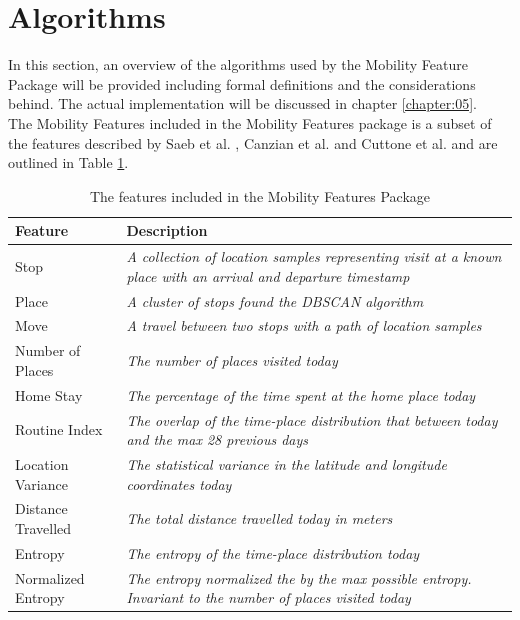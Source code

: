 \section{Algorithms}
\label{section:definitions}
In this section, an overview of the algorithms used by the Mobility Feature Package will be provided including formal definitions and the considerations behind. The actual implementation will be discussed in chapter \ref{chapter:05}.\\

The Mobility Features included in the Mobility Features package is a subset of the features described by Saeb et al. \cite{Saeb2015}, Canzian et al. \cite{Canzian2015} and Cuttone et al. \cite{sparse-location-2014} and are outlined in Table \ref{tab:features-nilsson}.

\begin{table}[h]
    \centering
    \begin{tabular}{|p{}|p{}|}
    \hline
    \textbf{Feature}   & \textbf{Description}                                                                                                  \\ \hline
    Stop               & \textit{A collection of location samples representing visit at a known place with an arrival and departure timestamp} \\ \hline
    Place              & \textit{A cluster of stops found the DBSCAN algorithm}                                                                \\ \hline
    Move               & \textit{A travel between two stops with a path of location samples}                                                   \\ \hline
    Number of Places   & \textit{The number of places visited today}                                                                           \\ \hline
    Home Stay          & \textit{The percentage of the time spent at the home place today}                                                     \\ \hline
    Routine Index      & \textit{The overlap of the time-place distribution that between today and the max 28 previous days}                   \\ \hline
    Location Variance  & \textit{The statistical variance in the latitude and longitude coordinates today}                                     \\ \hline
    Distance Travelled & \textit{The total distance travelled today in meters}                                                                 \\ \hline
    Entropy            & \textit{The entropy of the time-place distribution today}                                                             \\ \hline
    Normalized Entropy & \textit{The entropy normalized the by the max possible entropy. Invariant to the number of places visited today}      \\ \hline
    \end{tabular}
    \caption{The features included in the Mobility Features Package}
    \label{tab:features-nilsson}
\end{table}


